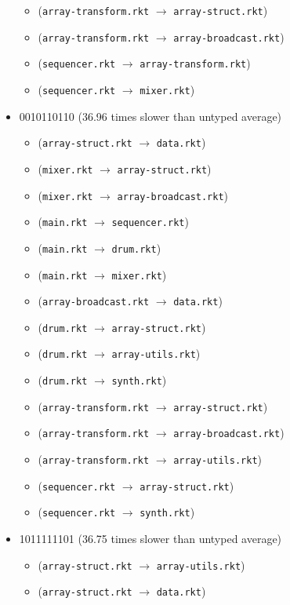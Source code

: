 \documentclass{article}
\newcommand{\mono}[1]{\texttt{#1}}
\begin{document}
\begin{itemize}
\begin{itemize}
  \item (\mono{array-transform.rkt} $\rightarrow$ \mono{array-struct.rkt})
  \item (\mono{array-transform.rkt} $\rightarrow$ \mono{array-broadcast.rkt})
  \item (\mono{sequencer.rkt} $\rightarrow$ \mono{array-transform.rkt})
  \item (\mono{sequencer.rkt} $\rightarrow$ \mono{mixer.rkt})
  \end{itemize}
\item 0010110110 (36.96 times slower than untyped average)
  \begin{itemize}
  \item (\mono{array-struct.rkt} $\rightarrow$ \mono{data.rkt})
  \item (\mono{mixer.rkt} $\rightarrow$ \mono{array-struct.rkt})
  \item (\mono{mixer.rkt} $\rightarrow$ \mono{array-broadcast.rkt})
  \item (\mono{main.rkt} $\rightarrow$ \mono{sequencer.rkt})
  \item (\mono{main.rkt} $\rightarrow$ \mono{drum.rkt})
  \item (\mono{main.rkt} $\rightarrow$ \mono{mixer.rkt})
  \item (\mono{array-broadcast.rkt} $\rightarrow$ \mono{data.rkt})
  \item (\mono{drum.rkt} $\rightarrow$ \mono{array-struct.rkt})
  \item (\mono{drum.rkt} $\rightarrow$ \mono{array-utils.rkt})
  \item (\mono{drum.rkt} $\rightarrow$ \mono{synth.rkt})
  \item (\mono{array-transform.rkt} $\rightarrow$ \mono{array-struct.rkt})
  \item (\mono{array-transform.rkt} $\rightarrow$ \mono{array-broadcast.rkt})
  \item (\mono{array-transform.rkt} $\rightarrow$ \mono{array-utils.rkt})
  \item (\mono{sequencer.rkt} $\rightarrow$ \mono{array-struct.rkt})
  \item (\mono{sequencer.rkt} $\rightarrow$ \mono{synth.rkt})
  \end{itemize}
\item 1011111101 (36.75 times slower than untyped average)
  \begin{itemize}
  \item (\mono{array-struct.rkt} $\rightarrow$ \mono{array-utils.rkt})
  \item (\mono{array-struct.rkt} $\rightarrow$ \mono{data.rkt})

\end{itemize}
\end{itemize}
\end{document}
